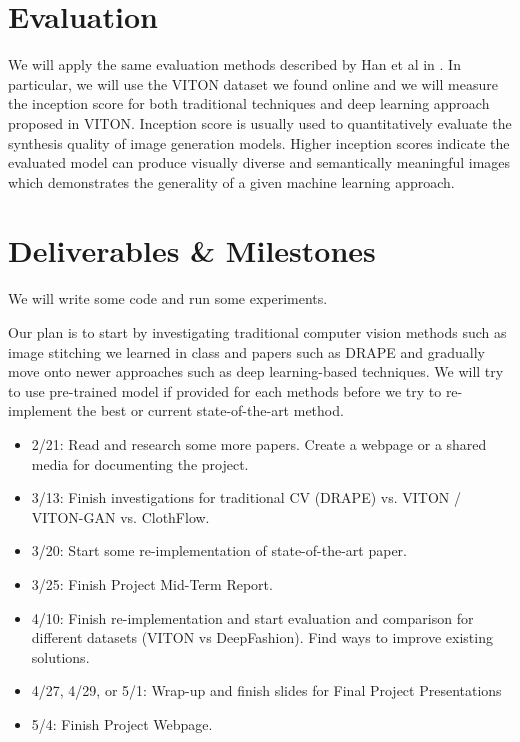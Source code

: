 \documentclass{article}
\begin{document}
\section{Evaluation}

We will apply the same evaluation methods described by Han et al in \cite{han2018viton}. In particular, we will use the VITON dataset we found online and we will measure the inception score for both traditional techniques and deep learning approach proposed in VITON.
Inception score is usually used to quantitatively evaluate the synthesis quality of image generation models. Higher inception scores indicate the evaluated model can produce visually diverse and semantically meaningful images which demonstrates the generality of a given machine learning approach. 

\section{Deliverables \& Milestones}
We will write some code and run some experiments.

Our plan is to start by investigating traditional computer vision methods such as image stitching we learned in class and papers such as DRAPE \cite{guan2012drape} and gradually move onto newer approaches such as deep learning-based techniques. We will try to use pre-trained model if provided for each methods before we try to re-implement the best or current state-of-the-art method.

\begin{itemize}
    \item 2/21: Read and research some more papers. Create a webpage or a shared media for documenting the project.
    \item 3/13: Finish investigations for traditional CV (DRAPE) vs. VITON / VITON-GAN vs. ClothFlow.
    \item 3/20: Start some re-implementation of state-of-the-art paper.
    \item 3/25: Finish Project Mid-Term Report.
    \item 4/10: Finish re-implementation and start evaluation and comparison for different datasets (VITON vs DeepFashion). Find ways to improve existing solutions.
    \item 4/27, 4/29, or 5/1: Wrap-up and finish slides for Final Project Presentations
    \item 5/4: Finish Project Webpage.
\end{itemize}
\end{document}
